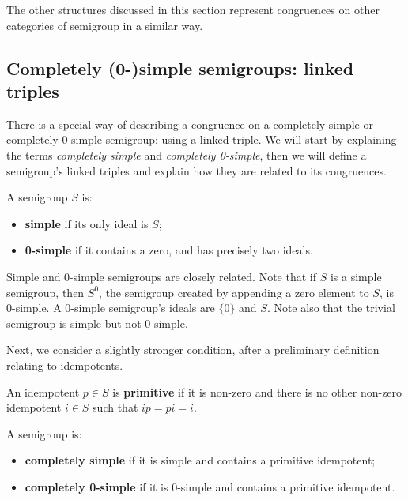 The other structures discussed in this section represent congruences on other
categories of semigroup in a similar way.

\subsection{Completely (0-)simple semigroups: linked triples}
\label{sec:linked-triples}

There is a special way of describing a congruence on a completely simple or
completely 0-simple semigroup: using a linked triple.  We will start by
explaining the terms \textit{completely simple} and \textit{completely
  0-simple}, then we will define a semigroup's linked triples and explain how
they are related to its congruences.

\begin{definition}
  \label{def:zerosimple}
  A semigroup $S$ is:
  \begin{itemize}
  \item \textbf{simple} if its only ideal is $S$;
  \item \textbf{0-simple} if it contains a zero, and has precisely two ideals.
  \end{itemize}
\end{definition}

Simple and 0-simple semigroups are closely related.  Note that if $S$ is a
simple semigroup, then $S^0$, the semigroup created by appending a zero element
to $S$, is 0-simple.  A 0-simple semigroup's ideals are $\{0\}$ and $S$.
Note also that the trivial semigroup is simple but not 0-simple.

Next, we consider a slightly stronger condition, after a preliminary definition
relating to idempotents.

\begin{definition}
  \label{def:primitive}
  An idempotent $p \in S$ is \textbf{primitive} if it is non-zero and there is
  no other non-zero idempotent $i \in S$ such that $ip = pi = i$.
\end{definition}

\begin{definition}
  \label{def:completelyzerosimple}
  A semigroup is:
  \begin{itemize}
  \item \textbf{completely simple} if it is simple and contains a primitive
    idempotent;
  \item \textbf{completely 0-simple} if it is 0-simple and contains a primitive
    idempotent.
  \end{itemize}
\end{definition}

